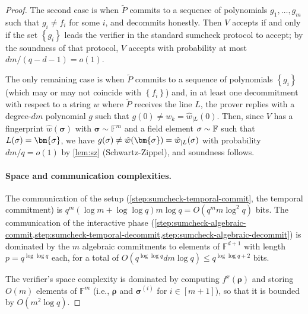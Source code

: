 \documentclass[a4paper,UKenglish,cleveref, autoref, thm-restate]{lipics-v2021}
\theoremstyle{definition}
\newcommand{\field}{\mathbb{F}}
\renewcommand{\set}[1]{\left\{#1\right\}}
\newcommand{\pcommitlength}{p}
\newcommand{\dimension}{m}
\newcommand{\degree}{d}
\newcommand{\fieldsize}{q}
\newcommand{\fingerprinttuple}{\bm{\rho}}
\newcommand{\Fingerprinttuple}{\bm{\sigma}}
\renewcommand{\line}{L}
\def\rfe#1{
    \ifnum#1=1
        \rho
    \else
    \ifnum#1=2
        \sigma
    \else
    \fi\fi
}
\begin{document}
\begin{proof}
    The second case is when $\widetilde P$ commits to a sequence of polynomials $g_1, \ldots, g_\dimension$ such that $g_i \neq f_i$ for some $i$, and decommits honestly. Then $V$ accepts if and only if the set $\set{g_i}$ leads the verifier in the standard sumcheck protocol to accept; by the soundness of that protocol, $V$ accepts with probability at most $\degree\dimension/(\fieldsize - \degree - 1) = o(1)$.
    
    The only remaining case is when $\widetilde P$ commits to a sequence of polynomials $\set{g_i}$ (which may or may not coincide with $\set{f_i}$) and, in at least one decommitment with respect to a string $w$ where $\widetilde P$ receives the line $\line$, the prover replies with a degree-$\degree\dimension$ polynomial $g$ such that $g(0) \neq w_k = \hat w_{|\line}(0)$. Then, since $V$ has a fingerprint $\hat w(\Fingerprinttuple)$ with $\Fingerprinttuple \sim \field^\dimension$ and a field element $\rfe2 \sim \field$ such that $\line(\rfe2) = \Fingerprinttuple$, we have $g(\rfe2) \neq \hat w(\Fingerprinttuple) =  \hat w_{|\line}(\rfe2)$ with probability $\degree\dimension/\fieldsize = o(1)$ by \cref{lem:sz} (Schwartz-Zippel), and soundness follows.
   
   \paragraph*{Space and communication complexities\iflipics\else.\fi} The communication of the setup (\cref{step:sumcheck-temporal-commit}, the temporal commitment) is $\fieldsize^\dimension (\log \dimension + \log\log \fieldsize) \dimension \log \fieldsize = O(\fieldsize^\dimension \dimension \log^2 \fieldsize)$ bits. The communication of the interactive phase (\cref{step:sumcheck-algebraic-commit,step:sumcheck-temporal-decommit,step:sumcheck-algebraic-decommit}) is dominated by the $\dimension$ algebraic commitments to elements of $\field^{\degree + 1}$ with length $\pcommitlength = \fieldsize^{\log\log \fieldsize}$ each, for a total of $O(\fieldsize^{\log\log \fieldsize} \degree \dimension \log \fieldsize) \leq \fieldsize^{\log\log \fieldsize + 2}$ bits.
   
   The verifier's space complexity is dominated by computing $f^x(\fingerprinttuple)$ and storing $O(\dimension)$ elements of $\field^\dimension$ (i.e., $\fingerprinttuple$ and $\Fingerprinttuple^{(i)}$ for $i \in [\dimension + 1]$), so that it is bounded by $O(\dimension^2 \log \fieldsize)$.
\end{proof}
\end{document}
